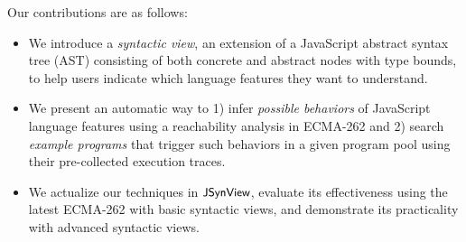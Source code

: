 Our contributions are as follows:
\begin{itemize}
  \item We introduce a \textit{syntactic view}, an extension of a JavaScript
    abstract syntax tree (AST) consisting of both concrete and abstract nodes
    with type bounds, to help users indicate which language features
    they want to understand.

  \item We present an automatic way to 1) infer \textit{possible behaviors} of
    JavaScript language features using a reachability analysis in ECMA-262 and
    2) search \textit{example programs} that trigger such behaviors in a given
    program pool using their pre-collected execution traces.

  \item We actualize our techniques in $\textsf{\small JSynView}$, evaluate its effectiveness using
    the latest ECMA-262 with  basic syntactic views, and demonstrate
    its practicality with  advanced syntactic views.
\end{itemize}
